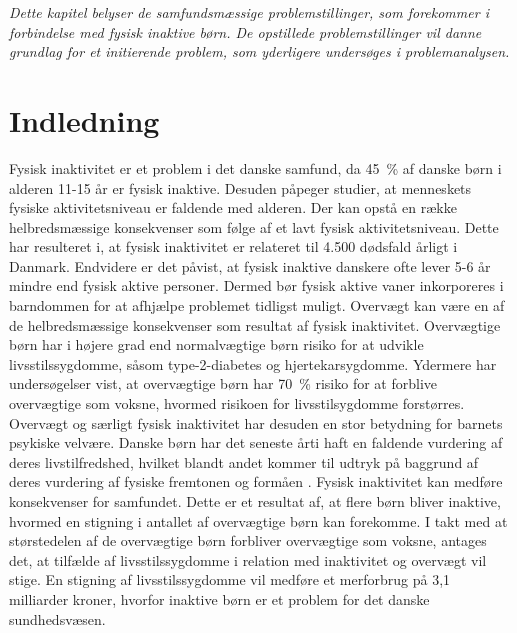 \textit{Dette kapitel belyser de samfundsmæssige problemstillinger, som forekommer i forbindelse med fysisk inaktive børn. De opstillede problemstillinger vil danne grundlag for et initierende problem, som yderligere undersøges i problemanalysen.}

\section{Indledning}
Fysisk inaktivitet er et problem i det danske samfund, da 45~\% af danske børn i alderen 11-15 år er fysisk inaktive. Desuden påpeger studier, at menneskets fysiske aktivitetsniveau er faldende med alderen. Der kan opstå en række helbredsmæssige konsekvenser som følge af et lavt fysisk aktivitetsniveau. \citep{Sundhedsstyrelsen2006} Dette har resulteret i, at fysisk inaktivitet er relateret til 4.500 dødsfald årligt i Danmark. Endvidere er det påvist, at fysisk inaktive danskere ofte lever 5-6 år mindre end fysisk aktive personer. \citep{JuelSoerensenBroennum-Hansen2006} Dermed bør fysisk aktive vaner inkorporeres i barndommen for at afhjælpe problemet tidligst muligt. %
Overvægt kan være en af de helbredsmæssige konsekvenser som resultat af fysisk inaktivitet. Overvægtige børn har i højere grad end normalvægtige børn risiko for at udvikle
livsstilssygdomme, såsom type-2-diabetes og hjertekarsygdomme. Ydermere har undersøgelser vist, at overvægtige børn har 70~\% risiko for at forblive overvægtige som voksne, hvormed risikoen for livsstilsygdomme forstørres. \citep{Reilly2006} Overvægt og særligt fysisk inaktivitet har desuden en stor betydning for barnets psykiske velvære. Danske børn har det seneste årti haft en faldende vurdering af deres livstilfredshed, hvilket blandt andet kommer til udtryk på baggrund af deres vurdering af fysiske fremtonen og formåen \citep{Universitet2014,StatensInstitutforFolkesundhed2007}. \newline
Fysisk inaktivitet kan medføre konsekvenser for samfundet. Dette er et resultat af, at flere børn bliver inaktive, hvormed en stigning i antallet af overvægtige børn kan forekomme. I takt med at størstedelen af de overvægtige børn forbliver overvægtige som voksne, antages det, at tilfælde af livsstilssygdomme i relation med inaktivitet og overvægt vil stige. En stigning af livsstilssygdomme vil medføre et merforbrug på 3,1 milliarder kroner, hvorfor inaktive børn er et problem for det danske sundhedsvæsen. \citep{JuelSoerensenBroennum-Hansen2006}

